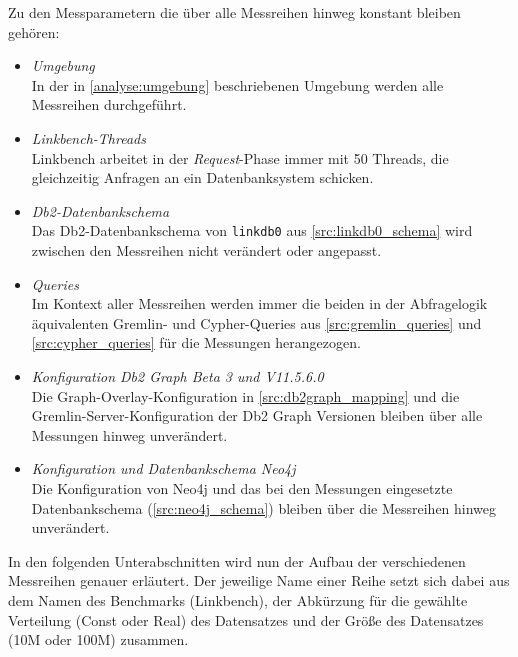 Zu den Messparametern die über alle Messreihen hinweg konstant bleiben gehören:
\begin{itemize}
    \item \textit{Umgebung}\\
    In der in \autoref{analyse:umgebung} beschriebenen Umgebung werden alle Messreihen durchgeführt. 
    \item \textit{Linkbench-Threads}\\
    Linkbench arbeitet in der \textit{Request}-Phase immer mit 50 Threads, die gleichzeitig Anfragen an ein Datenbanksystem schicken.
    \item \textit{Db2-Datenbankschema}\\
    Das Db2-Datenbankschema von \texttt{linkdb0} aus \autoref{src:linkdb0_schema} wird zwischen den Messreihen nicht verändert oder angepasst. 
    \item \textit{Queries}\\
    Im Kontext aller Messreihen werden immer die beiden in der Abfragelogik äquivalenten Gremlin- und Cypher-Queries aus \autoref{src:gremlin_queries} und \autoref{src:cypher_queries} für die Messungen herangezogen. 
    \item \textit{Konfiguration Db2 Graph Beta 3 und V11.5.6.0}\\
    Die Graph-Overlay-Konfiguration in \autoref{src:db2graph_mapping} und die Gremlin-Server-Konfiguration der Db2 Graph Versionen bleiben über alle Messungen hinweg unverändert.
    \item \textit{Konfiguration und Datenbankschema Neo4j}\\
    Die Konfiguration von Neo4j und das bei den Messungen eingesetzte Datenbankschema (\autoref{src:neo4j_schema}) bleiben über die Messreihen hinweg unverändert. 
\end{itemize}

In den folgenden Unterabschnitten wird nun der Aufbau der verschiedenen Messreihen genauer erläutert. Der jeweilige Name einer Reihe setzt sich dabei aus dem Namen des Benchmarks (Linkbench), der Abkürzung für die gewählte Verteilung (Const oder Real) des Datensatzes und der Größe des Datensatzes (10M oder 100M) zusammen.

